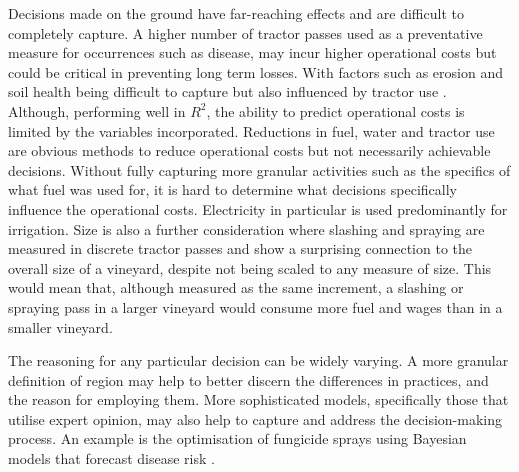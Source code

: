 \documentclass[review,12pt,authoryear]{elsarticle}
\begin{document}
\begin{linenumbers}
\par
Decisions made on the ground have far-reaching effects and are difficult to completely capture. A higher number of tractor passes used as a preventative measure for occurrences such as disease, may incur higher operational costs but could be critical in preventing long term losses. With factors such as erosion and soil health being difficult to capture but also influenced by tractor use \citep{capelloEffectsTractorPasses2019,capelloPermanentCoverSoil2020}. Although, performing well in $R^2$, the ability to predict operational costs is limited by the variables incorporated. Reductions in fuel, water and tractor use are obvious methods to reduce operational costs but not necessarily achievable decisions. Without fully capturing more granular activities such as the specifics of what fuel was used for, it is hard to determine what decisions specifically influence the operational costs. Electricity in particular is used predominantly for irrigation. Size is also a further consideration where slashing and spraying are measured in discrete tractor passes and show a surprising connection to the overall size of a vineyard, despite not being scaled to any measure of size. This would mean that, although measured as the same increment, a slashing or spraying pass in a larger vineyard would consume more fuel and wages than in a smaller vineyard.
\par
The reasoning for any particular decision can be widely varying. 
A more granular definition of region may help to better discern the differences in practices, and the reason for employing them. More sophisticated models, specifically those that utilise expert opinion, may also help to capture and address the decision-making process. An example is the optimisation of fungicide sprays using Bayesian models that forecast disease risk \citep{luDiseaseRiskForecasting2020}. 
\par





\end{linenumbers}
\end{document}
